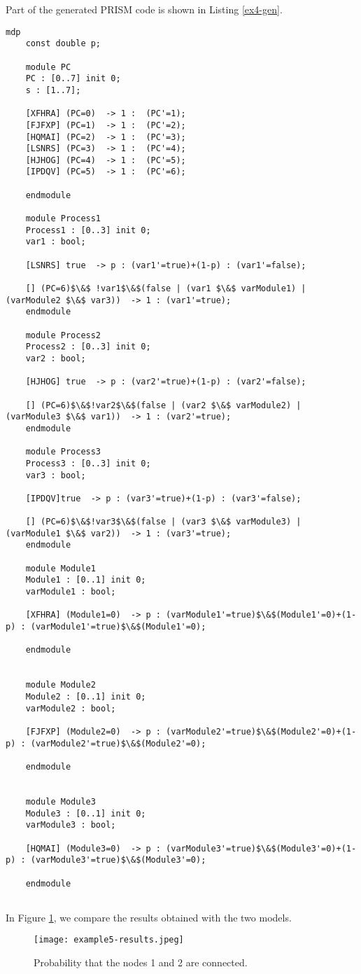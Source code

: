 Part of the generated PRISM code is shown in Listing \ref{ex4-gen}. 
\begin{lstlisting}[style=prism-color,caption={Generated PRISM program for the Random Graphs
	Protocol.},captionpos=b,label={ex4-gen}]
	mdp
	const double p;
	
	module PC
	PC : [0..7] init 0;
	s : [1..7]; 
	
	[XFHRA] (PC=0)  -> 1 :  (PC'=1); 
	[FJFXP] (PC=1)  -> 1 :  (PC'=2); 
	[HQMAI] (PC=2)  -> 1 :  (PC'=3); 
	[LSNRS] (PC=3)  -> 1 :  (PC'=4); 
	[HJHOG] (PC=4)  -> 1 :  (PC'=5); 
	[IPDQV] (PC=5)  -> 1 :  (PC'=6); 
	
	endmodule
	
	module Process1
	Process1 : [0..3] init 0;
	var1 : bool; 
	
	[LSNRS] true  -> p : (var1'=true)+(1-p) : (var1'=false); 
	
	[] (PC=6)$\&$ !var1$\&$(false | (var1 $\&$ varModule1) | (varModule2 $\&$ var3))  -> 1 : (var1'=true); 
	endmodule
	
	module Process2
	Process2 : [0..3] init 0;
	var2 : bool; 
	
	[HJHOG] true  -> p : (var2'=true)+(1-p) : (var2'=false); 
	
	[] (PC=6)$\&$!var2$\&$(false | (var2 $\&$ varModule2) | (varModule3 $\&$ var1))  -> 1 : (var2'=true); 
	endmodule
	
	module Process3
	Process3 : [0..3] init 0;
	var3 : bool; 
	
	[IPDQV]true  -> p : (var3'=true)+(1-p) : (var3'=false); 
	
	[] (PC=6)$\&$!var3$\&$(false | (var3 $\&$ varModule3) | (varModule1 $\&$ var2))  -> 1 : (var3'=true); 
	endmodule
	
	module Module1
	Module1 : [0..1] init 0;
	varModule1 : bool; 
	
	[XFHRA] (Module1=0)  -> p : (varModule1'=true)$\&$(Module1'=0)+(1-p) : (varModule1'=true)$\&$(Module1'=0); 
	
	endmodule
	
	
	module Module2
	Module2 : [0..1] init 0;
	varModule2 : bool; 
	
	[FJFXP] (Module2=0)  -> p : (varModule2'=true)$\&$(Module2'=0)+(1-p) : (varModule2'=true)$\&$(Module2'=0); 
	
	endmodule
	
	
	module Module3
	Module3 : [0..1] init 0;
	varModule3 : bool; 
	
	[HQMAI] (Module3=0)  -> p : (varModule3'=true)$\&$(Module3'=0)+(1-p) : (varModule3'=true)$\&$(Module3'=0); 
	
	endmodule
	
\end{lstlisting}


In Figure \ref{ex4-res}, we compare the results obtained with the two models.
\begin{figure}[h]
\centering
\texttt{[image: example5-results.jpeg]}	
\caption{Probability that the nodes 1 and 2 are connected.}
\label{ex4-res}
\end{figure}
